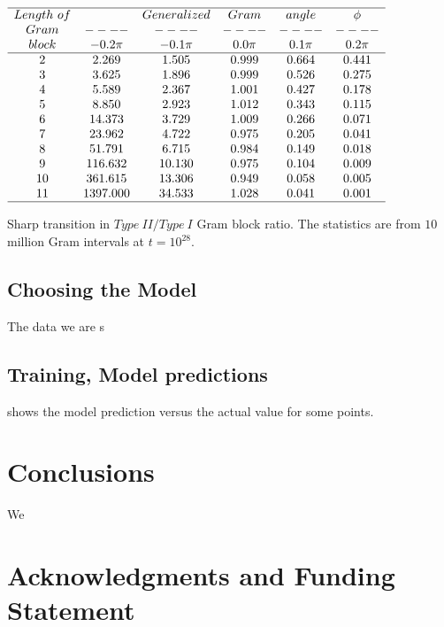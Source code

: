 \documentclass[twoside]{article}
\begin{document}
\begin{table}
\centering \(\begin{array}{cccccc}
\hline
Length~of  && Generalized &Gram&angle &\phi \\
Gram     &----&----&----&----&----\\
block  & -0.2\pi & -0.1\pi & 0.0\pi & 0.1\pi & 0.2\pi  \\
\hline
2 &2.269 &1.505 &0.999 &0.664 &0.441 \\
3 &3.625 &1.896 &0.999 &0.526 &0.275 \\
4 &5.589 &2.367 &1.001 &0.427 &0.178 \\
5 &8.850 &2.923 &1.012 &0.343 &0.115 \\
6 &14.373 &3.729 &1.009 &0.266 &0.071 \\
7 &23.962 &4.722 &0.975 &0.205 &0.041 \\
8 &51.791 &6.715 &0.984 &0.149 &0.018 \\
9 &116.632 &10.130 &0.975 &0.104 &0.009 \\
10 &361.615 &13.306 &0.949 &0.058 &0.005 \\
11 &1397.000 &34.533 &1.028 &0.041 &0.001 \\
\hline
\end{array}\)
\caption{Sharp transition in $Type~II/Type~I$ Gram block ratio.
The statistics are from $10$ million Gram intervals at $t=10^{28}$.}
\label{tab:ratioE28}
\end{table}



\subsection{\label{sec3.1} Choosing the Model}
The data we are s

\subsection{\label{relation}Training,  Model predictions}

shows the model prediction versus the actual value for some points.

\section{\label{conclusions}Conclusions}
We 

\section*{Acknowledgments and Funding Statement}
\end{document}
